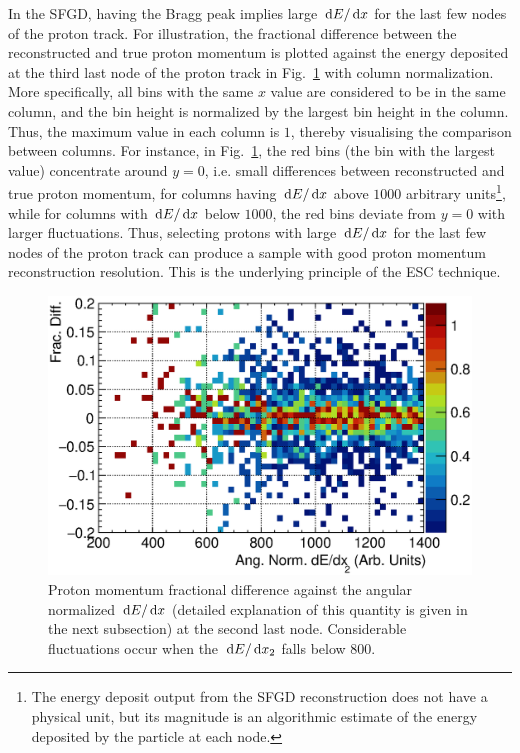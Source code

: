      In the SFGD, having the Bragg peak implies large $\,\textrm{d}E/\,\textrm{d}x$ for the last few nodes of the proton track.
     For illustration, the fractional difference between the reconstructed and true proton momentum is plotted against the energy deposited at the third last node of the proton track in Fig.~\ref{fig:dedx-pprres-eg} with column normalization.
     More specifically, all bins with the same $x$ value are considered to be in the same column, and the bin height is normalized by the largest bin height in the column.
     Thus, the maximum value in each column is $1$, thereby visualising the comparison between columns.
     For instance, in Fig.~\ref{fig:dedx-pprres-eg}, the red bins (the bin with the largest value) concentrate around $y=0$, i.e. small differences between reconstructed and true proton momentum, for columns having $\,\textrm{d}E/\,\textrm{d}x$ above $1000$ arbitrary units\footnote{ 
     The energy deposit output from the SFGD reconstruction does not have a physical unit, but its magnitude is an algorithmic estimate of the energy deposited by the particle at each node.}, while for columns with $\,\textrm{d}E/\,\textrm{d}x$ below $1000$, the red bins deviate from $y=0$ with larger fluctuations.
     Thus, selecting protons with large $\,\textrm{d}E/\,\textrm{d}x$ for the last few nodes of the proton track can produce a sample with good proton momentum reconstruction resolution.
     This is the underlying principle of the ESC technique.
    \begin{figure}[htb]
        \centering
        \includegraphics[width=\sgfidwid\linewidth]{figures/sel/fig51.eps}
        \caption{Proton momentum fractional difference against the angular normalized $\,\textrm{d}E/\,\textrm{d}x$ (detailed explanation of this quantity is given in the next subsection) at the second last node. Considerable fluctuations occur when the $\,\textrm{d}E/\,\textrm{d}x_2$ falls below $800$.}
        \label{fig:dedx-pprres-eg}
    \end{figure}
    
